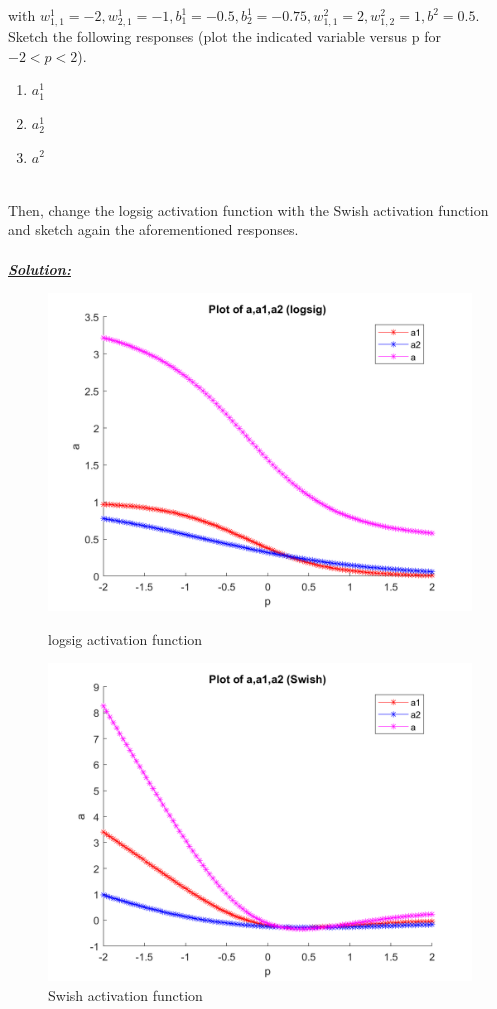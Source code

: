 \documentclass{article}
\begin{document}
\noindent with $w^1_{1,1} = -2, w^1_{2,1} = -1, b^1_1 = -0.5, b^1_2 = -0.75, w^2_{1,1} = 2, w^2_{1,2} = 1, b^2 = 0.5$. 
Sketch the following responses (plot the indicated variable versus p for $-2 < p < 2$).
\begin{enumerate}[label=\Alph*]
  \item $a^1_1$
  \item $a^1_2$
  \item $a^2$
\end{enumerate}

\noindent \\Then, change the logsig activation function with the Swish activation function and sketch 
again the aforementioned responses. \\ \\

\noindent \underline{\textbf{\textit{Solution:}}}
\begin{figure}[h]
  \centering
  \begin{minipage}[t]{0.5\textwidth}
    \centering
    \includegraphics[width=0.8\linewidth]{Problem5_logsig_all.png}
    \caption{logsig activation function} 
    \label{fig:img1}
  \end{minipage}%
  \begin{minipage}[t]{0.5\textwidth}
    \centering
    \includegraphics[width=0.8\linewidth]{Problem5_Swish_all.png}
    \caption{Swish activation function}
    \label{fig:img2}
  \end{minipage}
\end{figure}
\end{document}
